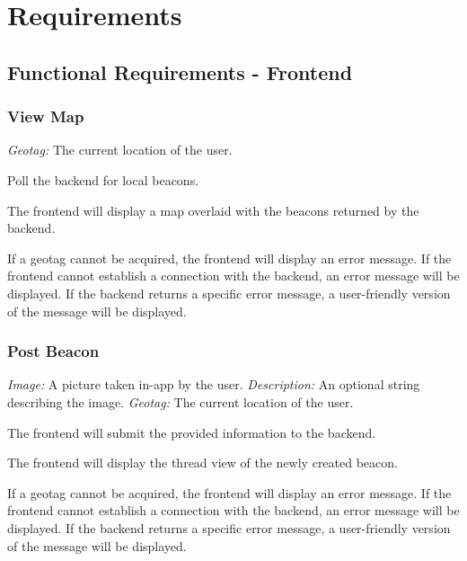 \section{Requirements}
    \subsection{Functional Requirements - Frontend}
        \subsubsection{View Map}
                \textit{Geotag:} The current location of the user.

                Poll the backend for local beacons.

                The frontend will display a map overlaid with the beacons returned
                by the backend.

                If a geotag cannot be acquired, the frontend will display an error
                message. \newline
                If the frontend cannot establish a connection with the backend,
                an error message will be displayed. \newline
                If the backend returns a specific error message, a user-friendly
                version of the message will be displayed.

        \subsubsection{Post Beacon}
                \textit{Image:} A picture taken in-app by the user. \newline
                \textit{Description:} An optional string describing the image. \newline
                \textit{Geotag:} The current location of the user.

                The frontend will submit the provided information to the backend.

                The frontend will display the thread view of the newly created beacon.

                If a geotag cannot be acquired, the frontend will display an error
                message. \newline
                If the frontend cannot establish a connection with the backend,
                an error message will be displayed. \newline
                If the backend returns a specific error message, a user-friendly
                version of the message will be displayed.

